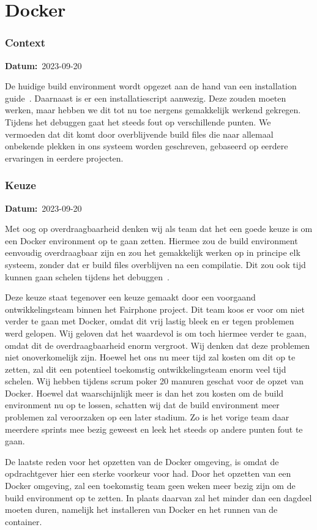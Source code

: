 \documentclass[a4paper]{report}
\newcommand{\teambox}{
  \begin{tcolorbox}[hbox, colback=blue!5!white,colframe=blue!75!black,
    left=.1mm, right=.1mm, top=.1mm, bottom=.1mm, fontupper=\scriptsize\sffamily]
    Team Keuze
  \end{tcolorbox}
}
\newcommand{\teamchoice}[1]{
  \section[ #1 ]{#1~\mbox{\raisebox{-2.5pt}{\teambox}}}
}
\newcommand{\timestamp}[1]{
  \mbox{\scriptsize \textbf{Datum:} #1} \smallbreak
}
\begin{document}
\teamchoice{Docker}
\label{sec:dockerchoice}
\subsubsection{Context}
\timestamp{2023-09-20}
De huidige build environment wordt opgezet aan de hand van een installation guide~\cite{fairphonegithub}.
Daarnaast is er een installatiescript aanwezig.
Deze zouden moeten werken, maar hebben we dit tot nu toe nergens gemakkelijk werkend gekregen.
Tijdens het debuggen gaat het steeds fout op verschillende punten. 
We vermoeden dat dit komt door overblijvende build files die naar allemaal onbekende plekken in ons systeem worden geschreven, gebaseerd op eerdere ervaringen in eerdere projecten.

\subsubsection{Keuze}
\timestamp{2023-09-20}
Met oog op overdraagbaarheid denken wij als team dat het een goede keuze is om een Docker environment op te gaan zetten. 
Hiermee zou de build environment eenvoudig overdraagbaar zijn en zou het gemakkelijk werken op in principe elk systeem, zonder dat er build files overblijven na een compilatie.
Dit zou ook tijd kunnen gaan schelen tijdens het debuggen~\cite{AffinityBridgeDockerProsCons}. 
\par\smallskip
Deze keuze staat tegenover een keuze gemaakt door een voorgaand ontwikkelingsteam binnen het Fairphone project. 
Dit team koos er voor om niet verder te gaan met Docker, omdat dit vrij lastig bleek en er tegen problemen werd gelopen.
Wij geloven dat het waardevol is om toch hiermee verder te gaan, omdat dit de overdraagbaarheid enorm vergroot. Wij denken dat deze problemen niet onoverkomelijk zijn.
Hoewel het ons nu meer tijd zal kosten om dit op te zetten, zal dit een potentieel toekomstig ontwikkelingsteam enorm veel tijd schelen.
Wij hebben tijdens scrum poker 20 manuren geschat voor de opzet van Docker. Hoewel dat waarschijnlijk meer is dan het zou kosten om de build environment nu op te lossen, schatten wij dat de build environment meer problemen zal veroorzaken op een later stadium. 
Zo is het vorige team daar meerdere sprints mee bezig geweest en leek het steeds op andere punten fout te gaan.

\par\smallskip
De laatste reden voor het opzetten van de Docker omgeving, is omdat de opdrachtgever hier een sterke voorkeur voor had. Door het opzetten van een Docker omgeving, zal een toekomstig team geen weken meer bezig zijn om de build environment op te zetten. In plaats daarvan zal het minder dan een dagdeel moeten duren, namelijk het installeren van Docker en het runnen van de container.
\end{document}
